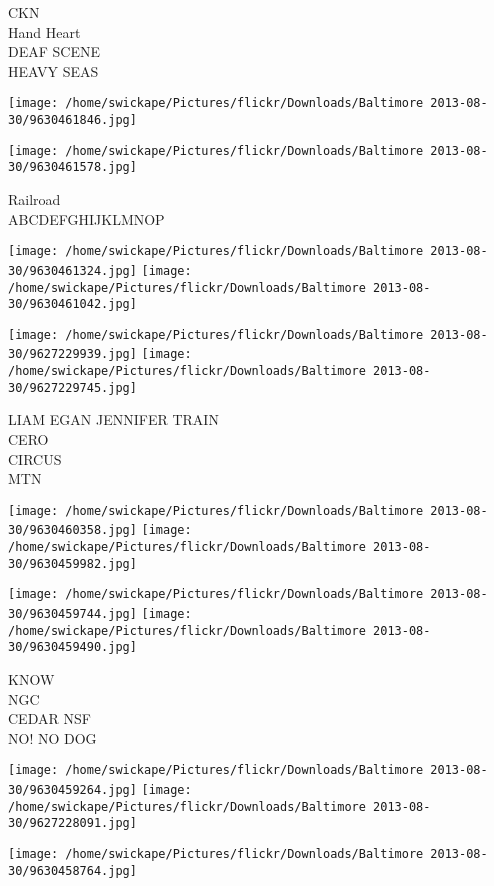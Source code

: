 \documentclass[10pt,letterpaper]{article}
\begin{document}
CKN\\
Hand Heart\\
DEAF SCENE\\
HEAVY SEAS
\pagebreak

\texttt{[image: /home/swickape/Pictures/flickr/Downloads/Baltimore 2013-08-30/9630461846.jpg]}

\vspace{0.25in}
\texttt{[image: /home/swickape/Pictures/flickr/Downloads/Baltimore 2013-08-30/9630461578.jpg]}

Railroad\\
ABCDEFGHIJKLMNOP
\pagebreak

\texttt{[image: /home/swickape/Pictures/flickr/Downloads/Baltimore 2013-08-30/9630461324.jpg]}
\texttt{[image: /home/swickape/Pictures/flickr/Downloads/Baltimore 2013-08-30/9630461042.jpg]}

\texttt{[image: /home/swickape/Pictures/flickr/Downloads/Baltimore 2013-08-30/9627229939.jpg]}
\texttt{[image: /home/swickape/Pictures/flickr/Downloads/Baltimore 2013-08-30/9627229745.jpg]}

LIAM EGAN JENNIFER TRAIN\\
CERO\\
CIRCUS\\
MTN
\pagebreak

\texttt{[image: /home/swickape/Pictures/flickr/Downloads/Baltimore 2013-08-30/9630460358.jpg]}
\texttt{[image: /home/swickape/Pictures/flickr/Downloads/Baltimore 2013-08-30/9630459982.jpg]}

\texttt{[image: /home/swickape/Pictures/flickr/Downloads/Baltimore 2013-08-30/9630459744.jpg]}
\texttt{[image: /home/swickape/Pictures/flickr/Downloads/Baltimore 2013-08-30/9630459490.jpg]}

KNOW\\
NGC\\
CEDAR NSF\\
NO! NO DOG
\pagebreak

\texttt{[image: /home/swickape/Pictures/flickr/Downloads/Baltimore 2013-08-30/9630459264.jpg]}
\texttt{[image: /home/swickape/Pictures/flickr/Downloads/Baltimore 2013-08-30/9627228091.jpg]}

\vspace{0.25in}
\texttt{[image: /home/swickape/Pictures/flickr/Downloads/Baltimore 2013-08-30/9630458764.jpg]}
\end{document}
